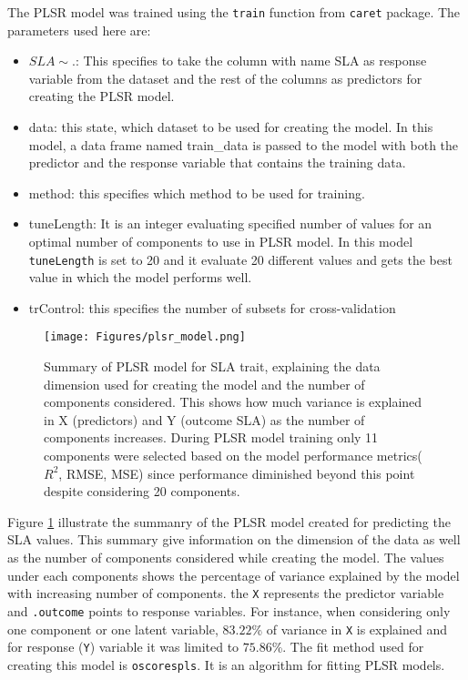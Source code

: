 \documentclass[12pt,a4paper]{report}
\begin{document}
The PLSR model was trained using the \texttt{train} function from \texttt{caret} package. The parameters used here are:
\begin{itemize}
    \item $SLA \sim .$: This specifies to take the column with name SLA as response variable from the dataset and the rest of the columns as predictors for creating the PLSR model.
    \item data: this state, which dataset to be used for creating the model. In this model, a data frame named train\_data is passed to the model with both the predictor and the response variable that contains the training data.
    \item method: this specifies which method to be used for training.
    \item tuneLength: It is an integer evaluating specified number of values for an optimal number of components to use in PLSR model. In this model \texttt{tuneLength} is set to 20 and it evaluate 20 different values and gets the best value in which the model performs well. 
    \item trControl: this specifies the number of subsets for cross-validation 
\end{itemize}

\begin{figure}[h]
    \centering
    \texttt{[image: Figures/plsr\_model.png]}
    \caption{Summary of PLSR model for SLA trait, explaining the data dimension used for creating the model and the number of components considered. This shows how much variance is explained in X (predictors) and Y (outcome SLA) as the number of components increases. During PLSR model training only 11 components were selected based on the model performance metrics($R^2$, RMSE, MSE) since performance diminished beyond this point despite considering 20 components.}
    \label{fig:plsr_model}
\end{figure}

Figure \ref{fig:plsr_model} illustrate the summanry of the PLSR model created for predicting the SLA values. This summary give information on the dimension of the data as well as the number of components considered while creating the model. The values under each components shows the percentage of variance explained by the model with increasing number of components. the \texttt{X} represents the predictor variable and \texttt{.outcome} points to response variables. For instance, when considering only one component or one latent variable, $83.22$\%  of variance in \texttt{X} is explained and for response (\texttt{Y}) variable it was limited to $75.86$\%. The fit method used for creating this model is \texttt{oscorespls}. It is an algorithm for fitting PLSR models. \\
\end{document}
